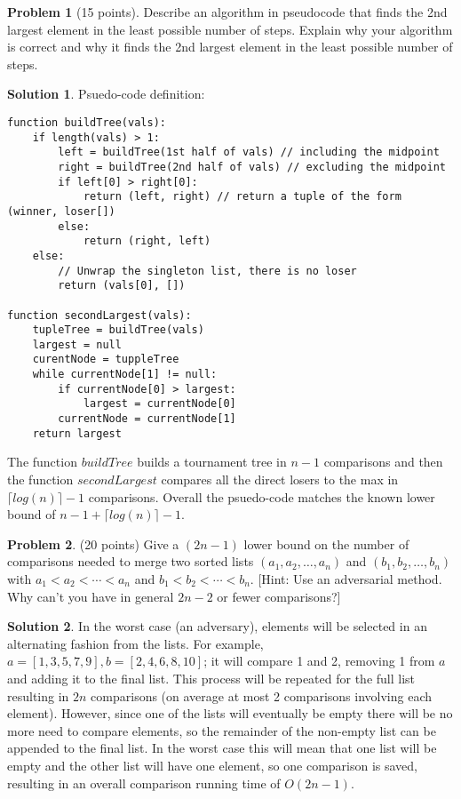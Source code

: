 \documentclass{article}
\theoremstyle{definition}
\newtheorem{problem}{Problem}
\newtheorem*{solution}{Solution}
\begin{document}
\begin{problem}[15 points]
Describe an algorithm in pseudocode that finds the 2nd largest element
in the least possible number of steps. Explain why your algorithm is
correct and why it finds the 2nd largest element in the least possible
number of steps. 
\end{problem}
\begin{solution}
Psuedo-code definition:\\
\begin{verbatim}
function buildTree(vals):
    if length(vals) > 1:
        left = buildTree(1st half of vals) // including the midpoint
        right = buildTree(2nd half of vals) // excluding the midpoint
        if left[0] > right[0]:
            return (left, right) // return a tuple of the form (winner, loser[])
        else:
            return (right, left)
    else:
        // Unwrap the singleton list, there is no loser
        return (vals[0], [])
        
function secondLargest(vals):
    tupleTree = buildTree(vals)
    largest = null
    curentNode = tuppleTree
    while currentNode[1] != null:
        if currentNode[0] > largest:
            largest = currentNode[0]
        currentNode = currentNode[1]
    return largest
\end{verbatim}
The function $buildTree$ builds a tournament tree in $n-1$ comparisons and then the function $secondLargest$ compares all the direct losers to the max in $\lceil log(n) \rceil - 1$ comparisons. Overall the psuedo-code matches the known lower bound of $n-1 + \lceil log(n) \rceil - 1$.
\end{solution}

\begin{problem} (20 points)
Give a $(2n-1)$ lower bound on the number of comparisons needed to
merge two sorted lists $(a_1,a_2,\ldots,a_n)$ and $(b_1,b_2,\ldots,
b_n)$ with $a_1<a_2<\cdots <a_n$ and $b_1<b_2<\cdots <b_n$. 
[Hint: Use an adversarial method. Why can't you have in general $2n-2$ or fewer 
comparisons?] 
\end{problem}
\begin{solution}
In the worst case (an adversary), elements will be selected in an alternating fashion from the lists. For example, $a = [1,3,5,7,9], b = [2,4,6,8,10]$; it will compare 1 and 2, removing 1 from $a$ and adding it to the final list. This process will be repeated for the full list resulting in $2n$ comparisons (on average at most 2 comparisons involving each element). However, since one of the lists will eventually be empty there will be no more need to compare elements, so the remainder of the non-empty list can be appended to the final list. In the worst case this will mean that one list will be empty and the other list will have one element, so one comparison is saved, resulting in an overall comparison running time of $O(2n-1)$.
\end{solution}
\end{document}
